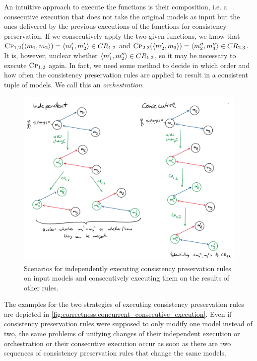 An intuitive approach to execute the functions is their composition, i.e. a consecutive execution that does not take the original models as input but the ones delivered by the previous executions of the functions for consistency preservation.
If we consecutively apply the two given functions, we know that $\textsc{Cp}_{1,2}(\langle m_{1}, m_{2} \rangle) = \langle m'_{1}, m'_{2} \rangle \in CR_{1,2}$ and 
$\textsc{Cp}_{2,3}(\langle m'_{2}, m_{3} \rangle) = \langle m''_{2}, m''_{3} \rangle \in CR_{2,3}$.
It is, however, unclear whether $\langle m'_{1}, m''_{2} \rangle \in CR_{1,2}$, so it may be necessary to execute $\textsc{Cp}_{1,2}$ again.
In fact, we need some method to decide in which order and how often the consistency preservation rules are applied to result in a consistent tuple of models.
We call this an \emph{orchestration}.

\begin{figure}
    \centering
    \includegraphics[width=\textwidth]{figures/correctness/notion/concurrent_consecutive_execution.png}
    \caption[Execution alternatives of consistency preservation rules]{Scenarios for independently executing consistency preservation rules on input models and consecutively executing them on the results of other rules.}
    \label{fig:correctness:concurrent_consecutive_execution}
\end{figure}

The examples for the two strategies of executing consistency preservation rules are depicted in \autoref{fig:correctness:concurrent_consecutive_execution}. 
Even if consistency preservation rules were supposed to only modify one model instead of two, the same problems of unifying changes of their independent execution or orchestration or their consecutive execution occur as soon as there are two sequences of consistency preservation rules that change the same models.

